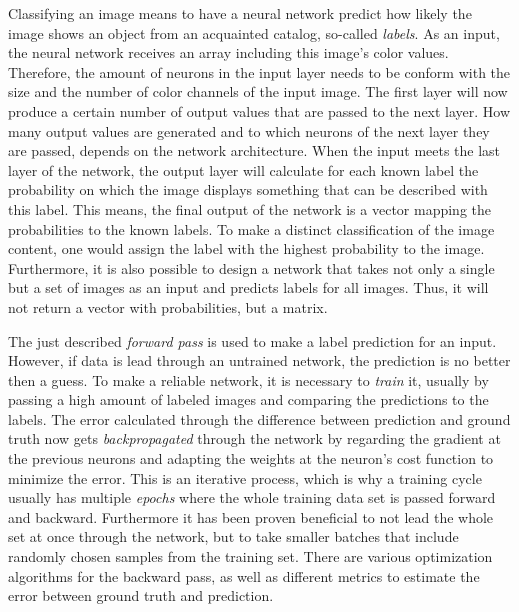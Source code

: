 \documentclass[12pt]{article}
\begin{document}
	Classifying an image means to have a neural network predict how likely the image shows an object from an acquainted catalog, so-called \textit{labels}. As an input, the neural network receives an array including this image's color values. Therefore, the amount of neurons in the input layer needs to be conform with the size and the number of color channels of the input image. The first layer will now produce a certain number of output values that are passed to the next layer. How many output values are generated and to which neurons of the next layer they are passed, depends on the network architecture. When the input meets the last layer of the network, the output layer will calculate for each known label the probability on which the image displays something that can be described with this label. This means, the final output of the network is a vector mapping the probabilities to the known labels. To make a distinct classification of the image content, one would assign the label with the highest probability to the image. Furthermore, it is also possible to design a network that takes not only a single but a set of images as an input and predicts labels for all images. Thus, it will not return a vector with probabilities, but a matrix.
	
	The just described \textit{forward pass} is used to make a label prediction for an input. However, if data is lead through an untrained network, the prediction is no better then a guess. To make a reliable network, it is necessary to \textit{train} it, usually by passing a high amount of labeled images and comparing the predictions to the labels. The error calculated through the difference between prediction and ground truth now gets \textit{backpropagated} through the network by regarding the gradient at the previous neurons and adapting the weights at the neuron's cost function to minimize the error. This is an iterative process, which is why a training cycle usually has multiple \textit{epochs} where the whole training data set is passed forward and backward. Furthermore it has been proven beneficial to not lead the whole set at once through the network, but to take smaller batches that include randomly chosen samples from the training set. There are various optimization algorithms for the backward pass, as well as different metrics to estimate the error between ground truth and prediction.
\end{document}

